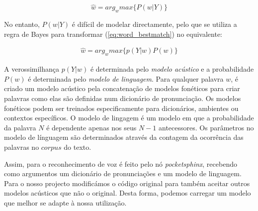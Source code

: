 \documentclass[journal]{IEEEtran}
\begin{document}
\begin{equation}
\label{eq:word_bestmatch}
  \hat{w}=arg_w max \{ P(w|Y) \}
\end{equation}

No entanto, $P(w|Y)$ é difícil de modelar directamente, pelo que se utiliza a regra de Bayes para transformar (\ref{eq:word_bestmatch})
 no equivalente:

\begin{eqnarray}
  \label{eq:word_bestmatch_equi}
   \hat{w} = arg_w max \{ p(Y|w) P(w) \}
\end{eqnarray}

A verossimilhança $p(Y|w)$ é determinada pelo \emph{modelo acústico} e a probabilidade $P(w)$ é determinada pelo \emph{modelo de linguagem}. Para qualquer palavra $w$, é criado um modelo acústico pela concatenação de modelos fonéticos para criar palavras como elas são definidas num dicionário de pronunciação. Os modelos fonéticos podem ser treinados especificamente para dicionários, ambientes ou contextos específicos. O modelo de lingagem é um modelo em que a probabilidade da palavra $N$ é dependente apenas nos seus $N-1$ antecessores. Os parâmetros no modelo de línguagem são determinados através da contagem da ocorrência das palavras no $corpus$ do texto.


Assim, para o reconhecimento de voz é feito pelo nó \textit{pocketsphinx}, recebendo como argumentos um dicionário de pronunciações e um modelo de linguagem. Para o nosso projecto modificámos o código original para também aceitar outros modelos acústicos que não o original. Desta forma, podemos carregar um modelo que melhor se adapte à nossa utilização.
\end{document}
